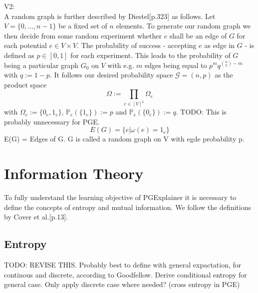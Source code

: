 V2: \\
A random graph is further described by Diestel\cite{Diestel2017}[p.323] as follows. Let $V = \{0,...,n-1\}$ be a fixed set of $n$ elements. To generate our random graph we then decide from some random experiment whether $e$ shall be an edge of $G$ for each potential $e \in V \times V$. The probability of success - accepting $e$ as edge in $G$ - is defined as $p \in [0,1]$ for each experiment. This leads to the probability of $G$ being a particular graph $G_0$ on $V$ with e.g. $m$ edges being equal to $p^m q^{\binom{n}{2}-m}$ with $q:=1-p$. It follows our desired probability space $\mathcal{G}=(n,p)$ as the product space
\begin{equation}
    \Omega := \prod_{e \in [V]^2} \Omega_e
\end{equation}
with $\Omega_e := \{0_e,1_e\}$, $\mathbb{P}_e(\{1_e\}) := p$ and $\mathbb{P}_e(\{0_e\}) := q$.
TODO: This is probably unnecessary for PGE.
\begin{equation}
    E(G) = \{e | \omega(e) = 1_e\}
\end{equation}
E(G) = Edges of G. G is called a random graph on V with egde probability p. \bigskip


\section{Information Theory}
To fully understand the learning objective of PGExplainer it is necessary to define the concepts of entropy and mutual information. We follow the definitions by Cover et al.\cite{Cover2005}[p.13].

\subsection{Entropy}
TODO: REVISE THIS. Probably best to define with general expactation, for continous and discrete, according to Goodfellow. Derive conditional entropy for general case. Only apply discrete case where needed? (cross entropy in PGE) \bigskip

